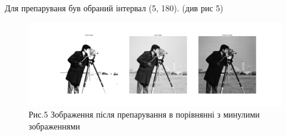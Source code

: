 \begin{enumerate}
    
    Для препаруваня був обраний інтервал (5, 180). (див рис 5)
    \begin{figure}[h]
        \begin{center}
            \includegraphics[width=\textwidth]{img_2.png}
        \end{center}
        \caption*{Рис.5 Зображення після препарування в порівнянні з минулими зображеннями}
    \end{figure}
\end{enumerate}
